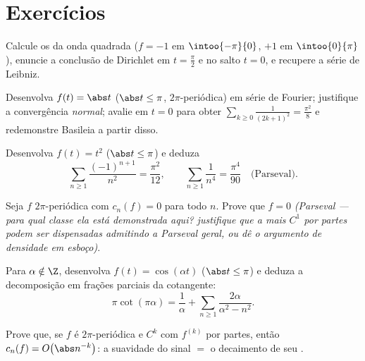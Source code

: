 \section{Exercícios}

\begin{exercise}[$\star$]\label{exo:b2:fourier:1}
Calcule os  da onda quadrada ($f = -1$ em
$\intoo{-\pi}{0}$, $+1$ em $\intoo{0}{\pi}$), enuncie a conclusão de
Dirichlet em $t = \frac\pi2$ e no salto $t = 0$, e recupere a
série de Leibniz.
\end{exercise}

\begin{exercise}[$\star$]\label{exo:b2:fourier:2}
Desenvolva $f(t) = \abs t$ ($\abs t \leq \pi$, $2\pi$-periódica) em
série de Fourier; justifique a convergência \emph{normal}; avalie em $t =
0$ para obter $\sum_{k\geq0}\frac{1}{(2k+1)^2} = \frac{\pi^2}{8}$
e redemonstre Basileia a partir disso.
\end{exercise}

\begin{exercise}[$\star$]\label{exo:b2:fourier:3}
Desenvolva $f(t) = t^2$ ($\abs t \leq \pi$) e deduza
\[
\sum_{n\geq1}\frac{(-1)^{n+1}}{n^2} = \frac{\pi^2}{12},
\qquad
\sum_{n\geq1}\frac{1}{n^4} = \frac{\pi^4}{90}
\quad\text{(Parseval)}.
\]
\end{exercise}

\begin{exercise}[$\star\star$]\label{exo:b2:fourier:4}
Seja $f$  $2\pi$-periódica com $c_n(f) = 0$ para todo
$n$. Prove que $f = 0$ \emph{(Parseval --- para qual classe ela está demonstrada
aqui? justifique que a  mais $C^1$ por partes podem ser dispensadas
admitindo a Parseval geral, ou dê o argumento de densidade em
esboço)}.
\end{exercise}

\begin{exercise}[$\star\star$]\label{exo:b2:fourier:5}
Para $\alpha \notin \Z$, desenvolva $f(t) = \cos(\alpha t)$ ($\abs t
\leq \pi$) e deduza a decomposição em frações parciais da
cotangente:
\[
\pi\cot(\pi\alpha) = \frac{1}{\alpha} + \sum_{n\geq1}
\frac{2\alpha}{\alpha^2 - n^2} .
\]
\end{exercise}

\begin{exercise}[$\star\star$]\label{exo:b2:fourier:6}
Prove que, se $f$ é $2\pi$-periódica e $C^k$ com $f^{(k)}$
 por partes, então $c_n(f) = O\bigl(\abs n^{-k}\bigr)$:
a suavidade do sinal $=$ o decaimento de seu .
\end{exercise}

